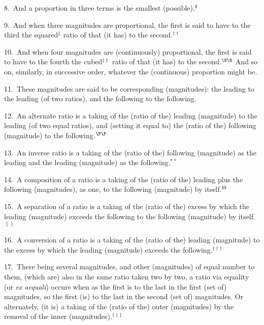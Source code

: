 8.~And a  proportion in three terms is the smallest (possible).$^\$$

9.~And when three magnitudes are proportional, the first is said to
have to the third the squared$^\|$ ratio  of that (it has) to the second.$^{\dag\dag}$

10.~And when four magnitudes are (continuously) proportional, the first is said to have to the fourth the cubed$^{\ddag\ddag}$ ratio  of that (it has) to the second.$^{\S\S}$ And  so on,   similarly, in successive order, whatever the (continuous) proportion
might be.

11.~These magnitudes are said to be corresponding (magnitudes):
the leading to the leading (of two ratios), and
the following to the following.

12.~An alternate ratio is a taking of the (ratio of the) leading  (magnitude) to the leading (of two equal ratios), and (setting it equal to) the (ratio of the)
following   (magnitude) to the following.$^{\P\P}$

13.~An inverse  ratio is a taking of the (ratio of the) following (magnitude) as the leading and the leading (magnitude) as the
following.$^{\ast\ast}$

14.~A composition of a  ratio is a taking of the (ratio of the) leading plus the following (magnitudes),
as one, to the  following (magnitude) by itself.$^{\$\$}$

 15.~A separation of a  ratio is a taking of the (ratio of the) excess by which the
 leading (magnitude) exceeds the following to the following (magnitude)
 by itself.$^{\|\|}$
 
16.~A conversion  of a ratio is a taking of the (ratio of the) leading (magnitude) 
 to the excess by which the leading (magnitude) exceeds the following.$^{\dag\dag\dag}$
 
17.~There being several magnitudes,
   and  other (magnitudes)
 of equal  number to them, (which are)  also in
 the same ratio taken two by two,
  a  ratio via equality (or {\em ex aequali}) occurs when  as the first is to the last  in the first (set of) magnitudes, so  the first (is) to the last   in the second (set of) magnitudes. Or alternately, (it is) a taking of the (ratio of the) outer (magnitudes) by the removal of the 
 inner (magnitudes).$^{\ddag\ddag\ddag}$
 
